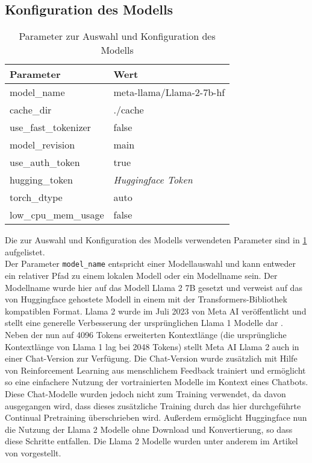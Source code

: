 \subsection{Konfiguration des Modells}
\begin{table}
    \centering
    \begin{tabular}{ll}
        \toprule
        \textbf{Parameter}   & \textbf{Wert}              \\
        \midrule
        model\_name          & meta-llama/Llama-2-7b-hf   \\
        cache\_dir           & ./cache                    \\
        use\_fast\_tokenizer & false                      \\
        model\_revision      & main                       \\
        use\_auth\_token     & true                       \\
        hugging\_token       & \textit{Huggingface Token} \\
        torch\_dtype         & auto                       \\
        low\_cpu\_mem\_usage & false                      \\
    \end{tabular}
    \caption{Parameter zur Auswahl und Konfiguration des Modells}\label{tab:model-config}
\end{table}
Die zur Auswahl und Konfiguration des Modells verwendeten Parameter sind in \cref{tab:model-config} aufgelistet.\\

Der Parameter \texttt{model\_name} entspricht einer Modellauswahl und kann entweder ein relativer Pfad zu einem lokalen Modell oder ein Modellname sein.
Der Modellname wurde hier auf das Modell Llama 2 7B gesetzt und verweist auf das von Huggingface gehostete Modell in einem mit der Transformers-Bibliothek kompatiblen Format.
Llama 2 wurde im Juli 2023 von Meta AI veröffentlicht und stellt eine generelle Verbesserung der ursprünglichen Llama 1 Modelle dar \citep{llama2}.
Neben der nun auf 4096 Tokens erweiterten Kontextlänge (die ursprüngliche Kontextlänge von Llama 1 lag bei 2048 Tokens) stellt Meta AI Llama 2 auch in einer Chat-Version zur Verfügung.
Die Chat-Version wurde zusätzlich mit Hilfe von Reinforcement Learning aus menschlichem Feedback trainiert und ermöglicht so eine einfachere Nutzung der vortrainierten Modelle im Kontext eines Chatbots.
Diese Chat-Modelle wurden jedoch nicht zum Training verwendet, da davon ausgegangen wird, dass dieses zusätzliche Training durch das hier durchgeführte Continual Pretraining überschrieben wird.
Außerdem ermöglicht Huggingface nun die Nutzung der Llama 2 Modelle ohne Download und Konvertierung, so dass diese Schritte entfallen.
Die Llama 2 Modelle wurden unter anderem im Artikel von \citet{llama2} vorgestellt.\\


